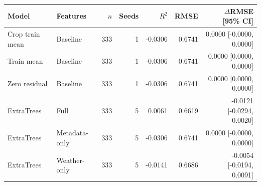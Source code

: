 \begin{tabular}{@{}llrrrrr@{}}
\toprule
Model & Features & $n$ & Seeds & $R^2$ & RMSE & $\Delta$RMSE [95\% CI] \\
\midrule
Crop train mean & Baseline & 333 & 1 & -0.0306 & 0.6741 & 0.0000 [-0.0000, 0.0000] \\
Train mean & Baseline & 333 & 1 & -0.0306 & 0.6741 & 0.0000 [0.0000, 0.0000] \\
Zero residual & Baseline & 333 & 1 & -0.0306 & 0.6741 & 0.0000 [0.0000, 0.0000] \\
ExtraTrees & Full & 333 & 5 & 0.0061 & 0.6619 & -0.0121 [-0.0294, 0.0020] \\
ExtraTrees & Metadata-only & 333 & 5 & -0.0306 & 0.6741 & 0.0000 [-0.0000, 0.0000] \\
ExtraTrees & Weather-only & 333 & 5 & -0.0141 & 0.6686 & -0.0054 [-0.0194, 0.0091] \\
\bottomrule
\end{tabular}
